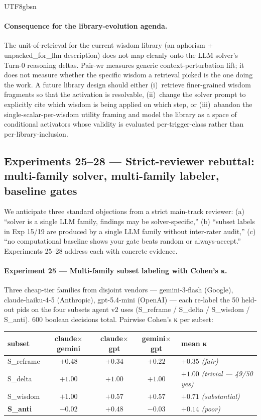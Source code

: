 \documentclass{article}
\begin{document}
\begin{CJK*}{UTF8}{gbsn}
\paragraph{Consequence for the library-evolution agenda.} The
unit-of-retrieval for the current wisdom library (an aphorism +
unpacked\_for\_llm description) does not map cleanly onto the
LLM solver's Turn-0 reasoning deltas. Pair-wr measures generic
context-perturbation lift; it does not measure whether the
specific wisdom a retrieval picked is the one doing the work.
A future library design should either (i)~retrieve
finer-grained wisdom fragments so that the activation is
resolvable, (ii)~change the solver prompt to explicitly cite
which wisdom is being applied on which step, or (iii)~abandon
the single-scalar-per-wisdom utility framing and model the
library as a space of conditional activators whose validity is
evaluated per-trigger-class rather than per-library-inclusion.


\subsection{Experiments 25--28 — Strict-reviewer rebuttal: multi-family
solver, multi-family labeler, baseline gates}
\label{sec:rebuttal}

We anticipate three standard objections from a strict main-track
reviewer: (a) ``solver is a single LLM family, findings may be
solver-specific,'' (b) ``subset labels in Exp 15/19 are produced by a
single LLM family without inter-rater audit,'' (c) ``no computational
baseline shows your gate beats random or always-accept.'' Experiments
25--28 address each with concrete evidence.

\paragraph{Experiment 25 — Multi-family subset labeling with Cohen's κ.}
Three cheap-tier families from disjoint vendors — gemini-3-flash
(Google), claude-haiku-4-5 (Anthropic), gpt-5.4-mini (OpenAI) — each
re-label the 50 held-out pids on the four subsets agent v2 uses
(S\_reframe / S\_delta / S\_wisdom / S\_anti). 600 boolean decisions
total. Pairwise Cohen's κ per subset:

\begin{center}\small
\begin{tabular}{l c c c l}
  \toprule
  subset & claude$\times$gemini & claude$\times$gpt & gemini$\times$gpt & mean κ \\
  \midrule
  S\_reframe & $+0.48$ & $+0.34$ & $+0.22$ & $+0.35$ \emph{(fair)} \\
  S\_delta   & $+1.00$ & $+1.00$ & $+1.00$ & $+1.00$ \emph{(trivial — 49/50 yes)} \\
  S\_wisdom  & $+1.00$ & $+0.57$ & $+0.57$ & $+0.71$ \emph{(substantial)} \\
  \textbf{S\_anti} & $-0.02$ & $+0.48$ & $-0.03$ & $\mathbf{+0.14}$ \emph{(poor)} \\
  \bottomrule
\end{tabular}
\end{center}


\end{CJK*}
\end{document}
